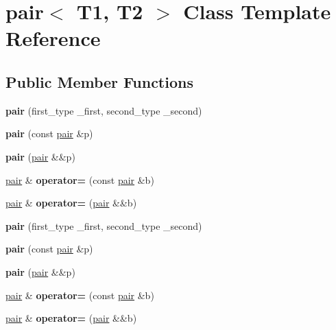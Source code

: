 \hypertarget{classpair}{}\section{pair$<$ T1, T2 $>$ Class Template Reference}
\label{classpair}
\subsection*{Public Member Functions}
\begin{DoxyCompactItemize}
\item 
{\bfseries pair} (first\+\_\+type \+\_\+first, second\+\_\+type \+\_\+second)\hypertarget{classpair_a6a030c1dfd12a03c2365eccd4ffda438}{}\label{classpair_a6a030c1dfd12a03c2365eccd4ffda438}

\item 
{\bfseries pair} (const \hyperlink{classpair}{pair} \&p)\hypertarget{classpair_a03ef68260b21952a57ab441e19334901}{}\label{classpair_a03ef68260b21952a57ab441e19334901}

\item 
{\bfseries pair} (\hyperlink{classpair}{pair} \&\&p)\hypertarget{classpair_ac47a2236c620b0a1c08ea5ceb3210761}{}\label{classpair_ac47a2236c620b0a1c08ea5ceb3210761}

\item 
\hyperlink{classpair}{pair} \& {\bfseries operator=} (const \hyperlink{classpair}{pair} \&b)\hypertarget{classpair_a37abe86ba7b68ff918c49564a1d2a27f}{}\label{classpair_a37abe86ba7b68ff918c49564a1d2a27f}

\item 
\hyperlink{classpair}{pair} \& {\bfseries operator=} (\hyperlink{classpair}{pair} \&\&b)\hypertarget{classpair_a637ad7195d47144c611af266e4377ff6}{}\label{classpair_a637ad7195d47144c611af266e4377ff6}

\item 
{\bfseries pair} (first\+\_\+type \+\_\+first, second\+\_\+type \+\_\+second)\hypertarget{classpair_a6a030c1dfd12a03c2365eccd4ffda438}{}\label{classpair_a6a030c1dfd12a03c2365eccd4ffda438}

\item 
{\bfseries pair} (const \hyperlink{classpair}{pair} \&p)\hypertarget{classpair_a03ef68260b21952a57ab441e19334901}{}\label{classpair_a03ef68260b21952a57ab441e19334901}

\item 
{\bfseries pair} (\hyperlink{classpair}{pair} \&\&p)\hypertarget{classpair_ac47a2236c620b0a1c08ea5ceb3210761}{}\label{classpair_ac47a2236c620b0a1c08ea5ceb3210761}

\item 
\hyperlink{classpair}{pair} \& {\bfseries operator=} (const \hyperlink{classpair}{pair} \&b)\hypertarget{classpair_a37abe86ba7b68ff918c49564a1d2a27f}{}\label{classpair_a37abe86ba7b68ff918c49564a1d2a27f}

\item 
\hyperlink{classpair}{pair} \& {\bfseries operator=} (\hyperlink{classpair}{pair} \&\&b)\hypertarget{classpair_a637ad7195d47144c611af266e4377ff6}{}\label{classpair_a637ad7195d47144c611af266e4377ff6}

\end{DoxyCompactItemize}
